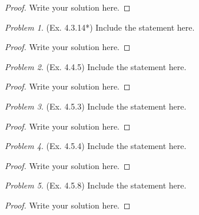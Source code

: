 \documentclass[11pt,twoside, reqno]{amsart}
\theoremstyle{remark}
\newtheorem{Prob}{Problem}
\begin{document}
\begin{proof}
Write your solution here.

\end{proof}

\begin{Prob}(Ex. 4.3.14*)  Include the statement here.
\end{Prob}

\begin{proof}
Write your solution here.

\end{proof}

\begin{Prob}(Ex. 4.4.5)  Include the statement here.
\end{Prob}

\begin{proof}
Write your solution here.

\end{proof}

\begin{Prob}(Ex. 4.5.3)  Include the statement here.
\end{Prob}

\begin{proof}
Write your solution here.

\end{proof}

\begin{Prob}(Ex. 4.5.4)  Include the statement here.
\end{Prob}

\begin{proof}
Write your solution here.

\end{proof}


\begin{Prob}(Ex. 4.5.8)  Include the statement here.
\end{Prob}

\begin{proof}
Write your solution here.

\end{proof}
\end{document}
